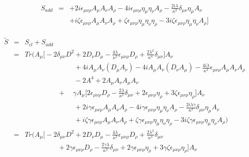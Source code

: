 \documentclass[10pt]{book}
\theoremstyle{break}
\begin{document}
 \begin{eqnarray*}
S_{add} &=&  + 2i \epsilon_{\mu \nu \rho} A_\mu A_\nu A_\rho - 4 i \epsilon_{\mu \nu \rho} \eta_\mu \eta_\nu A_\rho - \frac{2i \lambda}{\kappa^2} \delta_{\mu \nu} \eta_\mu A_\nu \nonumber \\
 && + i \zeta \epsilon_{\mu \nu \rho} A_\mu A_\nu A_\rho + \zeta \epsilon_{\mu \nu \rho} \eta_{\mu} \eta_\nu \eta_\rho - 3i \zeta \epsilon_{\mu \nu \rho} \eta_\mu \eta_\nu A_\rho \Bigg]  
\end{eqnarray*}

\begin{eqnarray*}
 \tilde{S} &=& S_{cl} + S_{add} \nonumber \\
 &=& Tr \Bigg( 
 A_\mu \bigg[ - 2 \delta_{\mu \nu} D^2 + 2 D_\nu D_\mu - \frac{4\lambda}{\kappa^2} \epsilon_{\mu \nu \rho}  D_\rho + \frac{2\lambda^2}{\kappa^4} \delta_{\mu \nu} \bigg] A_\nu \nonumber \\ 
 && \hspace{3cm} + 4i A_\mu A_\nu (D_\mu A_\nu) - 4i A_\mu A_\nu (D_\nu A_\mu) - \frac{4i\lambda}{\kappa^2} \epsilon_{\mu \nu \rho} A_\mu A_\nu A_\rho \nonumber \\
 && \hspace{3cm} - 2 A^4 + 2 A_\mu A_\nu A_\mu A_\nu \nonumber \\
 && \hspace{2cm} + \quad \gamma A_\mu \bigg[ 2 \epsilon_{\mu \nu \rho} D_\rho - \frac{2 \lambda}{\kappa^{2}} \delta_{\mu \nu} + 2 \epsilon_{\mu \nu \rho} \eta_{\rho} + 3 \zeta \epsilon_{\mu \nu \rho} \eta_\rho \bigg] A_\nu \nonumber \\ 
 && \hspace{3cm} + 2i \gamma \epsilon_{\mu \nu \rho} A_\mu A_\nu A_\rho - 4 i \gamma \epsilon_{\mu \nu \rho} \eta_\mu \eta_\nu A_\rho - \frac{2i \lambda \gamma}{\kappa^2} \delta_{\mu \nu} \eta_\mu A_\nu \nonumber \\
 && \hspace{3cm} + i \zeta \gamma \epsilon_{\mu \nu \rho} A_\mu A_\nu A_\rho + \zeta \gamma \epsilon_{\mu \nu \rho} \eta_{\mu} \eta_\nu \eta_\rho - 3i \zeta \gamma \epsilon_{\mu \nu \rho} \eta_\mu \eta_\nu A_\rho \Bigg) \nonumber \\
 &=& Tr \Bigg( 
 A_\mu \bigg[ - 2 \delta_{\mu \nu} D^2 + 2 D_\nu D_\mu - \frac{4\lambda}{\kappa^2} \epsilon_{\mu \nu \rho}  D_\rho + \frac{2\lambda^2}{\kappa^4} \delta_{\mu \nu} \nonumber \\
 && \hspace{2cm} + 2 \gamma \epsilon_{\mu \nu \rho} D_\rho - \frac{2 \gamma \lambda}{\kappa^{2}} \delta_{\mu \nu} + 2 \gamma \epsilon_{\mu \nu \rho} \eta_{\rho} + 3 \gamma \zeta \epsilon_{\mu \nu \rho} \eta_\rho \bigg] A_\nu \nonumber \\ 

\end{eqnarray*}
\end{document}
